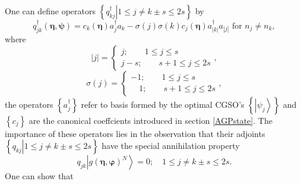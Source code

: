 \documentclass{preprint}
\begin{document}
One can define operators $\left\{ \left. q_{kj}^{\dagger }\right\vert 1\leq
j\neq k\pm s\leq 2s\right\} $ by
\begin{equation}
q_{jk}^{\dagger }\left( \bm{\eta,\psi}\right) =c_{k}\left( \bm{\eta }\right)
a_{j}^{\dagger }a_{k}-\sigma \left( j\right) \sigma \left( k\right)
c_{j}\left( \bm{\eta}\right) a_{\left\vert k\right\vert }^{\dagger
}a_{\left\vert j\right\vert }\text{ for }n_{j}\neq n_{k},
\end{equation}%
where%
\begin{equation}
\left\vert j\right\vert =\left\{
\begin{array}{c}
j;\qquad 1\leq j\leq s \\
j-s;\qquad s+1\leq j\leq 2s%
\end{array}%
\right. ,
\end{equation}%
\begin{equation}
\sigma \left( j\right) =\left\{
\begin{array}{c}
-1;\qquad 1\leq j\leq s\quad \quad \\
\quad 1;\qquad s+1\leq j\leq 2s%
\end{array}%
\right. ,
\end{equation}%
the operators $\left\{ a_{j}^{\dagger }\right\} $ refer to basis formed by
the optimal CGSO's $\left\{ \left\vert \psi _{j}\right\rangle \right\} $ and
$\left\{ c_{j}\right\} $ are the canonical coeffcients introduced in section %
\ref{AGPstate}. The importance of these operators lies in the observation
that their adjoints $\left\{ \left. q_{kj}\right\vert 1\leq j\neq k\pm s\leq
2s\right\} $ have the special annihilation property%
\begin{equation}
q_{jk}\left\vert g\left( \bm{\eta},\bm{\varphi}\right) ^{N}\right\rangle
=0;\quad 1\leq j\neq k\pm s\leq 2s.
\end{equation}%
One can show \cite{Goscinski82a} that
\end{document}
